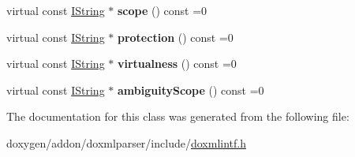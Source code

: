 \begin{DoxyCompactItemize}
\mbox{\label{class_i_member_reference_a03c260b8caefa88f1795a07fe58725d0}} 
virtual const \mbox{\hyperlink{class_i_string}{I\+String}} $\ast$ {\bfseries scope} () const =0
\item 
\mbox{\label{class_i_member_reference_a72be0800929ad0d6203dec8d54c51f46}} 
virtual const \mbox{\hyperlink{class_i_string}{I\+String}} $\ast$ {\bfseries protection} () const =0
\item 
\mbox{\label{class_i_member_reference_aaca18605eb8061bb6aacc2d003508e68}} 
virtual const \mbox{\hyperlink{class_i_string}{I\+String}} $\ast$ {\bfseries virtualness} () const =0
\item 
\mbox{\label{class_i_member_reference_a22d546b2a7ec35b9e162f47b9f09000f}} 
virtual const \mbox{\hyperlink{class_i_string}{I\+String}} $\ast$ {\bfseries ambiguity\+Scope} () const =0
\end{DoxyCompactItemize}


The documentation for this class was generated from the following file\+:\begin{DoxyCompactItemize}
\item 
doxygen/addon/doxmlparser/include/\mbox{\hyperlink{include_2doxmlintf_8h}{doxmlintf.\+h}}\end{DoxyCompactItemize}
